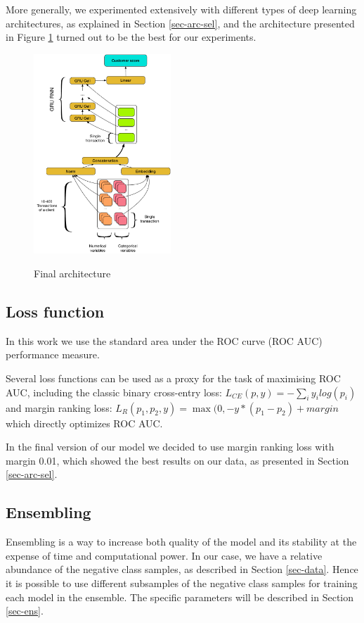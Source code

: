 \documentclass[sigconf]{acmart}
\begin{document}
More generally, we experimented extensively with different types of deep learning architectures, as explained in Section \ref{sec-arc-sel}, and the architecture presented in Figure \ref{fig-arch} turned out to be the best for our experiments.


\begin{figure}[ht]
  \caption{Final architecture}
  \includegraphics[width=0.46\textwidth]{figures/architecture.pdf}
  \label{fig-arch}
\end{figure}

\subsection{Loss function}

In this work we use the standard area under the ROC curve (ROC AUC) performance measure.

Several loss functions can be used as a proxy for the task of maximising ROC AUC, including the classic binary cross-entry loss: $L_{CE}(p, y) = - \sum_i y_ilog(p_i)$ and margin ranking loss: $ L_R(p_1, p_2, y) = \max(0, -y * (p_1 - p_2) + margin $ which directly optimizes ROC AUC.

In the final version of our model we decided to use margin ranking loss with margin 0.01, which showed the best results on our data, as presented in Section \ref{sec-arc-sel}.

\subsection{Ensembling} \label{sec-method-ens}

Ensembling \cite{breiman1996bagging} is a way to increase both quality of the model and its stability at the expense of time and computational power. In our case, we have a relative abundance of the negative class samples, as described in Section \ref{sec-data}. Hence it is possible to use different subsamples of the negative class samples for training each model in the ensemble. The specific parameters will be described in Section \ref{sec-ens}.
\end{document}
